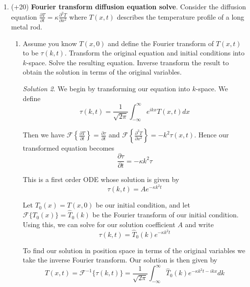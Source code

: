\documentclass[10pt]{article}
\theoremstyle{definition}
\theoremstyle{remark}
\newtheorem*{solution}{Solution}
\begin{document}
\begin{enumerate}
    \begin{solution}
        We have $$p \odot p = \frac{1}{\sqrt{2\pi}} \int_{-\infty}^\infty p^*(\tau) p(t+\tau) d\tau$$

        Plugging in our provided function and looking at where $p(t) \ne 0$, we see that can write this as 

        \begin{align*}
            p \odot p &= \frac{1}{\sqrt{2\pi}} \int_{0}^{1-t} d\tau  \\
            &= \frac{1-t}{\sqrt{2 \pi}}
        \end{align*}
    \end{solution}

    \item (+20) \textbf{Fourier transform diffusion equation solve}. Consider the diffusion equation $\frac{\partial T}{\partial t} = \kappa \frac{\partial^2 T}{\partial x^2}$ where $T(x,t)$ describes the temperature profile of a long metal rod. 
    \begin{enumerate}[label=\alph*]
        \item Assume you know $T(x,0)$ and define the Fourier transform of $T(x,t)$ to be $\tau(k,t)$. Transform the original equation and initial conditions into $k$-space. Solve the resulting equation. Inverse transform the result to obtain the solution in terms of the original variables. 
        \begin{solution}
            We begin by transforming our equation into $k$-space. We define $$\tau(k,t) = \frac{1}{\sqrt{2\pi}} \int_{-\infty}^\infty e^{ikx} T(x,t) dx$$

            Then we have $\mathcal F\left\{ \frac{\partial T}{\partial t} \right\} = \frac{\partial \tau}{\partial t}$ and $\mathcal F\left\{ \frac{\partial^2 T}{\partial x^2} \right\} = -k^2 \tau(x,t)$. Hence our transformed equation becomes $$\frac{\partial \tau}{\partial t} = -\kappa k^2 \tau$$

            This is a first order ODE whose solution is given by $$\tau (k,t) = A e^{-\kappa k^2 t}$$

            Let $T_0(x) = T(x,0)$ be our initial condition, and let $\mathcal F\{T_0(x)\} = \hat T_0(k)$ be the Fourier transform of our initial condition. Using this, we can solve for our solution coefficient $A$ and write $$\tau(k,t) = \hat T_0(k) e^{-\kappa k^2 t}$$

            To find our solution in position space in terms of the original variables we take the inverse Fourier transform. Our solution is then given by $$T(x,t) = \mathcal F^{-1} \{ \tau(k,t) \} =  \frac{1}{\sqrt{2\pi}} \int_{-\infty}^\infty \hat T_0(k) e^{-\kappa k^2 t - ikx} dk$$
        \end{solution}


\end{enumerate}
\end{enumerate}
\end{document}
